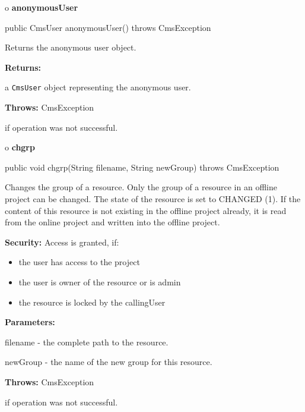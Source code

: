 o {\bf anonymousUser} 

\begin{PRE}
 public CmsUser anonymousUser() throws CmsException
\end{PRE}

\begin{description}
\htmlDD Returns the anonymous user object. 

\begin{description}
\item {\bf Returns:}  

a {\tt CmsUser} object representing the anonymous user.  
\item {\bf Throws:} CmsException  

if operation was not successful.  
\end{description}

\end{description}

o {\bf chgrp} 

\begin{PRE}
 public void chgrp(String filename,
                   String newGroup) throws CmsException
\end{PRE}

\begin{description}
\htmlDD Changes the group of a resource. \htmlBR
Only the group of a resource in an offline project can be changed. The state
of the resource is set to CHANGED (1). If the content of this resource is not
existing in the offline project already, it is read from the online project
and written into the offline project. 

{\bf Security:} Access is granted, if: 

\begin{itemize}
\item the user has access to the project 
\item the user is owner of the resource or is admin 
\item the resource is locked by the callingUser 
\end{itemize}

\begin{description}
\item {\bf Parameters:}  

filename - the complete path to the resource.  

newGroup - the name of the new group for this resource.  
\item {\bf Throws:} CmsException  

if operation was not successful.  
\end{description}

\end{description}

